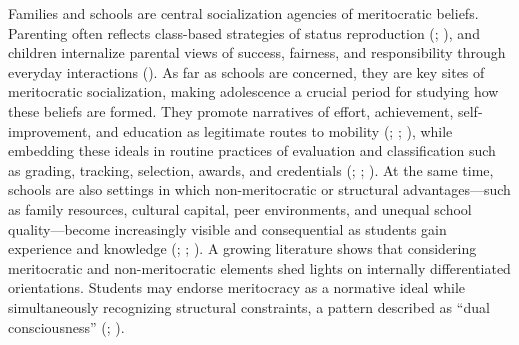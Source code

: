 \documentclass[
  13pt,
]{article}
\begin{document}
Families and schools are central socialization agencies of meritocratic
beliefs. Parenting often reflects class-based strategies of status
reproduction (; ), and children internalize parental views of success, fairness,
and responsibility through everyday interactions
(). As far as
schools are concerned, they are key sites of meritocratic socialization,
making adolescence a crucial period for studying how these beliefs are
formed. They promote narratives of effort, achievement,
self-improvement, and education as legitimate routes to mobility
(;
;
), while embedding
these ideals in routine practices of evaluation and classification such
as grading, tracking, selection, awards, and credentials
(;
;
). At the same
time, schools are also settings in which non-meritocratic or structural
advantages---such as family resources, cultural capital, peer
environments, and unequal school quality---become increasingly visible
and consequential as students gain experience and knowledge
(;
;
). A growing
literature shows that considering meritocratic and non-meritocratic
elements shed lights on internally differentiated orientations. Students
may endorse meritocracy as a normative ideal while simultaneously
recognizing structural constraints, a pattern described as ``dual
consciousness'' (;
).
\end{document}
